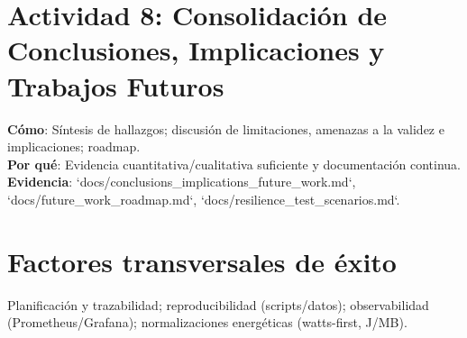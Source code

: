 \section{Actividad 8: Consolidación de Conclusiones, Implicaciones y Trabajos Futuros}
\textbf{Cómo}: Síntesis de hallazgos; discusión de limitaciones, amenazas a la validez e implicaciones; roadmap.\\
\textbf{Por qué}: Evidencia cuantitativa/cualitativa suficiente y documentación continua.\\
\textbf{Evidencia}: `docs/conclusions_implications_future_work.md`, `docs/future_work_roadmap.md`, `docs/resilience_test_scenarios.md`.

\section*{Factores transversales de éxito}
Planificación y trazabilidad; reproducibilidad (scripts/datos); observabilidad (Prometheus/Grafana); normalizaciones energéticas (watts-first, J/MB).
